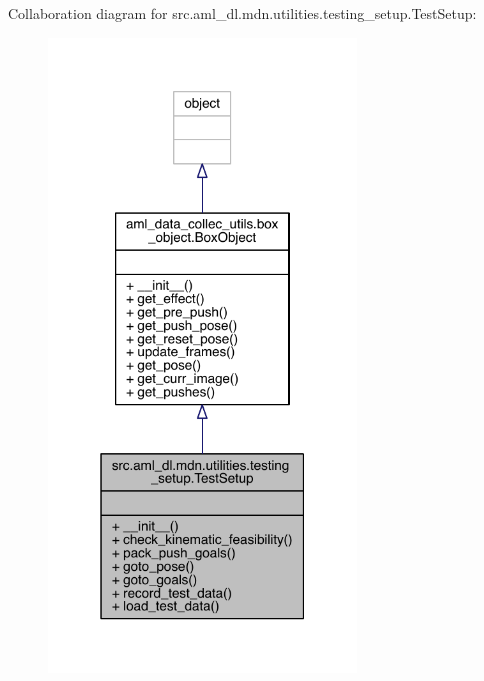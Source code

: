 Collaboration diagram for src.\+aml\+\_\+dl.\+mdn.\+utilities.\+testing\+\_\+setup.\+Test\+Setup\+:
\nopagebreak
\begin{figure}[H]
\begin{center}
\leavevmode
\includegraphics[width=232pt]{classsrc_1_1aml__dl_1_1mdn_1_1utilities_1_1testing__setup_1_1_test_setup__coll__graph}
\end{center}
\end{figure}
